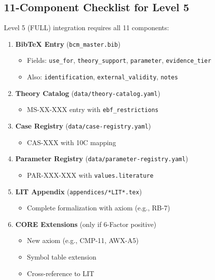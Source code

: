 \subsection{11-Component Checklist for Level 5}
\label{sec:paperint-11components}

Level 5 (FULL) integration requires all 11 components:

\begin{enumerate}
    \item \textbf{BibTeX Entry} (\texttt{bcm\_master.bib})
    \begin{itemize}
        \item Fields: \texttt{use\_for}, \texttt{theory\_support}, \texttt{parameter}, \texttt{evidence\_tier}
        \item Also: \texttt{identification}, \texttt{external\_validity}, \texttt{notes}
    \end{itemize}

    \item \textbf{Theory Catalog} (\texttt{data/theory-catalog.yaml})
    \begin{itemize}
        \item MS-XX-XXX entry with \texttt{ebf\_restrictions}
    \end{itemize}

    \item \textbf{Case Registry} (\texttt{data/case-registry.yaml})
    \begin{itemize}
        \item CAS-XXX with 10C mapping
    \end{itemize}

    \item \textbf{Parameter Registry} (\texttt{data/parameter-registry.yaml})
    \begin{itemize}
        \item PAR-XXX-XXX with \texttt{values.literature}
    \end{itemize}

    \item \textbf{LIT Appendix} (\texttt{appendices/*LIT*.tex})
    \begin{itemize}
        \item Complete formalization with axiom (e.g., RB-7)
    \end{itemize}

    \item \textbf{CORE Extensions} (only if 6-Factor positive)
    \begin{itemize}
        \item New axiom (e.g., CMP-11, AWX-A5)
        \item Symbol table extension
        \item Cross-reference to LIT
    \end{itemize}


\end{enumerate}
